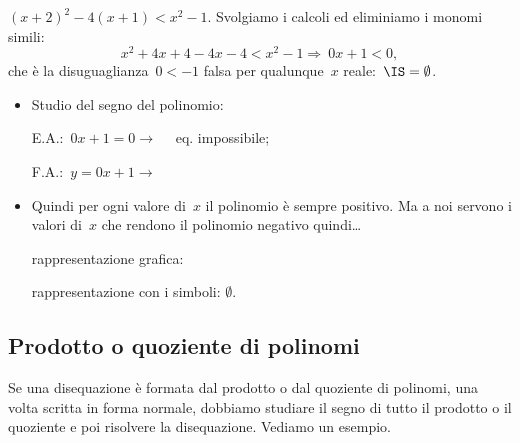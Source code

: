 \begin{esempio}
\((x+2)^2-4(x+1)<x^{2}-1.\)
Svolgiamo i calcoli ed eliminiamo i monomi simili:
\[x^{2}+4x+4-4x-4<x^{2}-1\Rightarrow~0 x + 1 < 0,\]
che è la disuguaglianza~\(0<-1\) falsa per qualunque~\(x\) reale:~\(\IS=\emptyset \).
\begin{itemize} [noitemsep]
 \item Studio del segno del polinomio:\\
 \begin{minipage}{.45\textwidth}
  E.A.:~\(0 x + 1 = 0  \rightarrow \quad \) eq. impossibile;
 \end{minipage}
 \begin{minipage}{.25\textwidth}
  F.A.:~\(y=0 x + 1 \rightarrow \)
 \end{minipage}
 \begin{minipage}{.3\textwidth}
%   
  \segnipos
 \end{minipage}
 \item Quindi per ogni valore di~\(x\) il polinomio è sempre positivo. 
  Ma a noi servono i valori di~\(x\) che rendono il polinomio negativo 
  quindi\dots
 \subitem 
  \begin{minipage}{.35\textwidth}
   rappresentazione grafica: 
  \end{minipage}
  \begin{minipage}{.30\textwidth}
%    
  \end{minipage}
 \subitem rappresentazione con i simboli: \quad \(\emptyset\). 
\end{itemize}
\end{esempio}

\subsection{Prodotto o quoziente di polinomi}
\label{sec:dis_prod_quo}

Se una disequazione è formata dal prodotto o dal quoziente di polinomi, 
una volta scritta in forma normale,
dobbiamo studiare il segno di tutto il prodotto o il quoziente e poi risolvere
la disequazione.
Vediamo un esempio.

